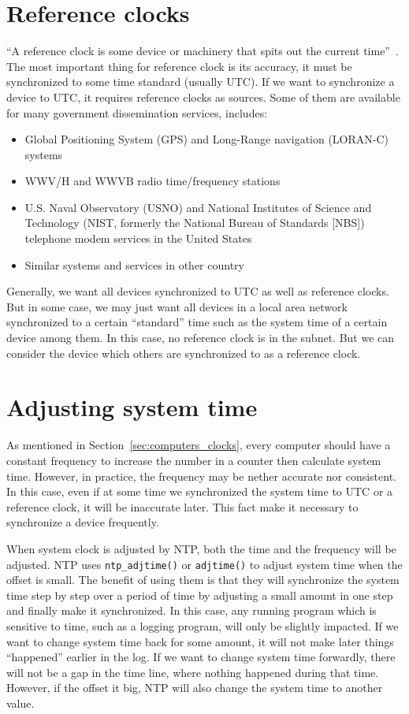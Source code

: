 \section{Reference clocks}%
\label{sec:reference_clocks}
``A reference clock is some device or machinery that spits out the current
time''~\cite{reference_clock}.
The most important thing for reference clock is its accuracy, it must be
synchronized to some time standard (usually UTC). If we want to synchronize a
device to UTC, it requires reference clocks as sources. Some of them are
available for many government dissemination services, includes:~\cite{redbook}
\begin{itemize}
    \item Global Positioning System (GPS) and Long-Range navigation (LORAN-C)
        systems
    \item WWV/H and WWVB radio time/frequency stations
    \item U.S. Naval Observatory (USNO) and National Institutes of Science and
        Technology (NIST\null, formerly the National Bureau of Standards [NBS])
        telephone modem services in the United States
    \item Similar systems and services in other country
\end{itemize}
Generally, we want all devices synchronized to UTC as well as reference clocks.
But in some case, we may just want all devices in a local area network
synchronized to a certain ``standard'' time such as the system time of a
certain device among them. In this case, no reference clock is in the subnet.
But we can consider the device which others are synchronized to as a reference
clock. 

\section{Adjusting system time}%
\label{sec:adjusting_system_time}
As mentioned in Section~\ref{sec:computers_clocks}, every computer should have
a constant frequency to increase the number in a counter then calculate system
time. However, in practice, the frequency may be nether accurate nor
consistent. In this case, even if at some time we synchronized the system time
to UTC or a reference clock, it will be inaccurate later. This fact make it
necessary to synchronize a device frequently.

When system clock is adjusted by NTP\null, both the time and the frequency
will be adjusted. NTP uses \verb|ntp_adjtime()| or \verb|adjtime()| to adjust
system time when the offset is small. The benefit of using them is that they
will synchronize the system time step by step over a period of time by
adjusting a small amount in one step and finally make it synchronized. In
this case, any running program which is sensitive to time, such as a logging
program, will only be slightly impacted. If we want to change system time
back for some amount, it will not make later things ``happened'' earlier in
the log. If we want to change system time forwardly, there will not be a gap
in the time line, where nothing happened during that time. However, if the
offset it big, NTP will also change the system time to another value.

